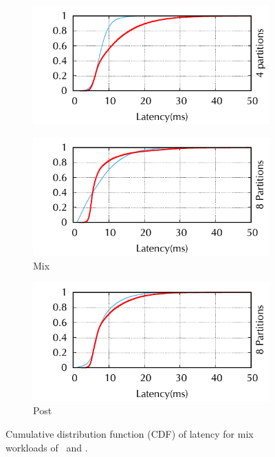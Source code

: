 \begin{figure}[ht!]
\begin{subfigure}{.48\textwidth}
\end{subfigure}
\begin{subfigure}{.48\textwidth}
      \centering
      \includegraphics[width=\textwidth]{./figures/experiments/dssmr/latency-cdf-post-4p}
\end{subfigure}
\begin{subfigure}{.48\textwidth}
      \centering
      \includegraphics[width=\textwidth]{./figures/experiments/dssmr/latency-cdf-mix-8p}
      \caption{Mix}
\end{subfigure}
\begin{subfigure}{.48\textwidth}
      \centering
      \includegraphics[width=\textwidth]{./figures/experiments/dssmr/latency-cdf-post-8p}
      \caption{Post}
\end{subfigure}
\caption{Cumulative distribution function (CDF) of latency for mix workloads of \dssmr\ and \ssmr.}%
\label{fig:dssmr-cdf}
\end{figure}


